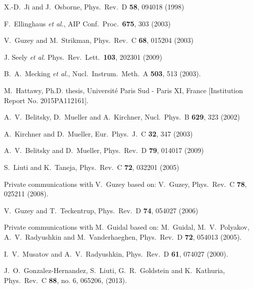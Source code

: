 \documentclass[twocolumn,nofootinbib,showpacs,prl,superscriptaddress,secnumarabic,amssymb,nobibnotes,aps,floatfix]{revtex4}
\begin{document}
\begin{thebibliography}{99}
X.-D.~Ji and J.~Osborne, 
Phys.\ Rev.\ D {\bf 58}, 094018 (1998)

F.~Ellinghaus {\it et al.},
AIP Conf.\ Proc.\  {\bf 675}, 303 (2003)

  V.~Guzey and M.~Strikman,
  Phys.\ Rev.\ C {\bf 68}, 015204 (2003)

J. Seely {\it et al.} 
Phys.\ Rev.\ Lett.\ {\bf 103}, 202301 (2009)

   B.~A.~Mecking {\it et al.},
   Nucl.\ Instrum.\ Meth.\ A {\bf 503}, 513 (2003).

M.~Hattawy, Ph.D. thesis, Universit{\'e} Paris Sud - Paris XI, France 
[Institution Report No. 2015PA112161].

A.~V.~Belitsky, D.~Mueller and A.~Kirchner,
Nucl.\ Phys.\ B {\bf 629}, 323 (2002)

A.~Kirchner and D.~Mueller, 
Eur.\ Phys.\ J.\ C {\bf 32}, 347 (2003)

A.~V.~Belitsky and D.~Mueller,
Phys.\ Rev.\ D {\bf 79}, 014017 (2009)


S.~Liuti and K.~Taneja, 
Phys.\ Rev.\ C {\bf 72}, 032201 (2005)

Private communications with V.~Guzey based on: 
V.~Guzey, Phys.\ Rev.\ C {\bf 78}, 025211 (2008).

V.~Guzey and T.~Teckentrup,
Phys.\ Rev.\ D {\bf 74}, 054027 (2006)

Private communications with M.~Guidal based on: 
M.~Guidal, M.~V.~Polyakov, A.~V.~Radyushkin and M.~Vanderhaeghen, 
Phys.\ Rev.\ D {\bf 72}, 054013 (2005).

I.~V.~Musatov and A.~V.~Radyushkin, 
Phys.\ Rev.\ D {\bf 61}, 074027 (2000).

J.~O.~Gonzalez-Hernandez, S.~Liuti, G.~R.~Goldstein and K.~Kathuria,
Phys.\ Rev.\ C {\bf 88}, no. 6, 065206, (2013).

\end{thebibliography}
\end{document}
